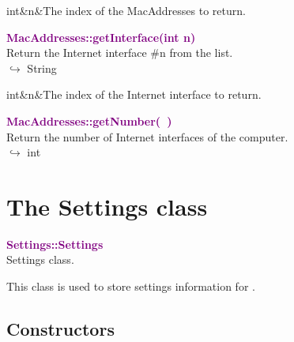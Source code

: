 \begin{tcolorbox}[width=\textwidth,myArgs,tabularx={ll|R}]
int&n&The index of the MacAddresses to return.
\end{tcolorbox}


\textcolor{purple}{\textbf{MacAddresses::getInterface(int n)}}\label{MacAddresses::getInterface(int n)}\\
Return the Internet interface \#n from the list.\\ \hspace*{10mm}$\hookrightarrow$ String

\begin{tcolorbox}[width=\textwidth,myArgs,tabularx={ll|R}]
int&n&The index of the Internet interface to return.
\end{tcolorbox}


\textcolor{purple}{\textbf{MacAddresses::getNumber(~)}}\label{MacAddresses::getNumber()}\\
Return the number of Internet interfaces of the computer.\\ \hspace*{10mm}$\hookrightarrow$ int


\section{The Settings class}

\textcolor{purple}{\textbf{Settings::Settings}}\label{Settings::Settings}\\
Settings class.

This class is used to store settings information for \DynELA.

\subsection{Constructors}

